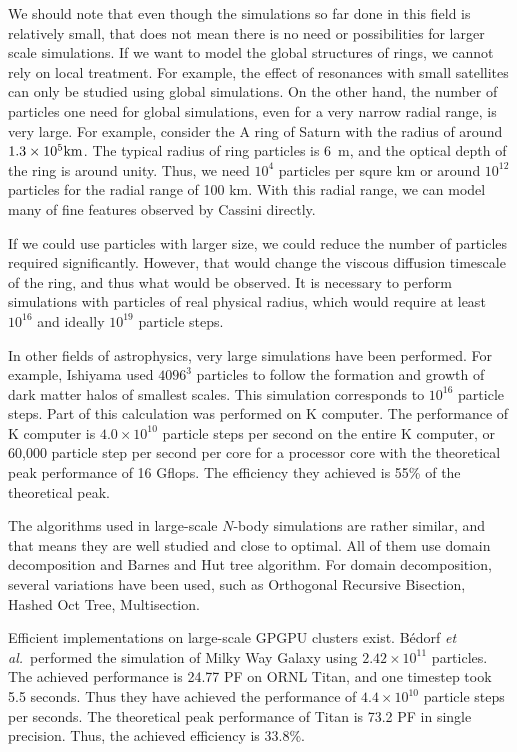 \documentclass[conference]{IEEEtran}
\begin{document}
We should note that even though the simulations so far done in this
field is relatively small, that does not mean there is no need or
possibilities for larger scale simulations. If we want to model the
global structures of rings, we cannot rely on local treatment. For
example, the effect of resonances with small satellites can only be
studied using global simulations. On the other hand, the number of
particles one need for global simulations, even  for a very narrow
radial range, is very large. For example, consider the A ring of Saturn
with the radius of around $1.3\times 10^5\rm km$. The typical radius
of ring particles is 6~m\cite{ZEBKER1985531}, and the optical depth of
the ring is around unity. Thus, we need $10^4$ particles per squre km
or around $10^{12}$ particles for the radial range of 100
km. With this radial range, we can model many of fine features observed
by Cassini directly.

If we could use particles with larger size, we could reduce the number
of particles required significantly. However, that would change the
viscous diffusion timescale of the ring, and thus what would be
observed. It is necessary to perform
simulations with particles of real physical radius, which would require
at least $10^{16}$ and ideally $10^{19}$ particle steps.

In other fields of astrophysics, very large simulations have been
performed. For example, Ishiyama\cite{Ishiyama2014} used $4096^3$
particles to follow the formation and growth of dark matter halos of
smallest scales. This simulation corresponds to  $10^{16}$ particle
steps. Part of this calculation was performed on K computer. The
performance of K computer is $4.0\times 10^{10}$ particle steps per
second on the entire K computer, or 60,000 particle step per second
per core for a processor core with the theoretical peak performance of
16 Gflops\cite{Ishiyamaetal2012}. The efficiency they achieved is 55\%
of the theoretical peak. 


The algorithms used in large-scale $N$-body simulations are rather
similar, and that means they are well studied and close to optimal.
 All of them use domain
decomposition and Barnes and Hut tree algorithm. For domain
decomposition, several variations have been used, such as
Orthogonal Recursive Bisection\cite{Salmon1990}, Hashed Oct
Tree\cite{WarrenSalmon1992}, Multisection\cite{Makino2004}.


Efficient implementations on large-scale GPGPU clusters
exist\cite{Hamadaetal2009, PortegiesZwartetal2014, Bedorfetal2014}.
B{\'e}dorf {\it et al.}\ performed the simulation of Milky Way Galaxy
  using $2.42 \times 10^{11}$ particles. The achieved performance is
  24.77 PF on ORNL Titan, and one timestep took 5.5 seconds. Thus
  they have achieved the performance of $4.4 \times 10^{10}$ particle
  steps per seconds. The theoretical peak performance of Titan is 73.2
  PF in single precision. Thus, the achieved efficiency is 33.8\%.
\end{document}
